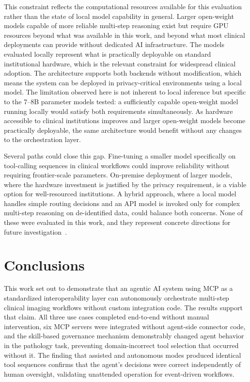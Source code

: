 \documentclass[conference]{IEEEtran}
\begin{document}
This constraint reflects the computational resources available for this evaluation rather than the state of local model capability in general. Larger open-weight models capable of more reliable multi-step reasoning exist but require GPU resources beyond what was available in this work, and beyond what most clinical deployments can provide without dedicated AI infrastructure. The models evaluated locally represent what is practically deployable on standard institutional hardware, which is the relevant constraint for widespread clinical adoption. The architecture supports both backends without modification, which means the system can be deployed in privacy-critical environments using a local model. The limitation observed here is not inherent to local inference but specific to the 7--8B parameter models tested: a sufficiently capable open-weight model running locally would satisfy both requirements simultaneously. As hardware accessible to clinical institutions improves and larger open-weight models become practically deployable, the same architecture would benefit without any changes to the orchestration layer.

Several paths could close this gap. Fine-tuning a smaller model specifically on tool-calling sequences in clinical workflows could improve reliability without requiring frontier-scale parameters. On-premise deployment of larger models, where the hardware investment is justified by the privacy requirement, is a viable option for well-resourced institutions. A hybrid approach, where a local model handles simple routing decisions and an API model is invoked only for complex multi-step reasoning on de-identified data, could balance both concerns. None of these were evaluated in this work, and they represent concrete directions for future investigation~\cite{trustworthyai2025, dietrich2025agentic, agiformedicalimaging2025}.

\section{Conclusions}

This work set out to demonstrate that an agentic AI system using MCP as a standardized interoperability layer can autonomously orchestrate multi-step clinical imaging workflows without custom integration code. The results support that claim. All three use cases completed end-to-end without manual intervention, six MCP servers were integrated without agent-side connector code, and the skill-based governance mechanism demonstrably changed agent behavior in the pathology task, preventing domain-incorrect tool selection that occurred without it. The finding that assisted and autonomous modes produced identical tool sequences confirms that the agent's decisions were correct independently of human oversight, validating unattended operation for event-driven workflows.
\end{document}
